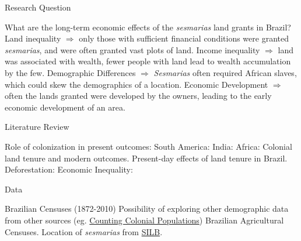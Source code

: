 \documentclass[aspectratio=1610, handout]{beamer}
\begin{document}
\begin{frame}{Research Question}
    \begin{outline}
        \1 What are the long-term economic effects of the \textit{sesmarias} land grants in Brazil?
            \2 Land inequality $\Rightarrow$ only those with sufficient financial conditions were granted \textit{sesmarias}, and were often granted vast plots of land.
            \2 Income inequality $\Rightarrow$ land was associated with wealth, fewer people with land lead to wealth accumulation by the few.
            \2 Demographic Differences $\Rightarrow$ \textit{Sesmarias} often required African slaves, which could skew the demographics of a location.
            \2 Economic Development $\Rightarrow$ often the lands granted were developed by the owners, leading to the early economic development of an area.
    \end{outline}
\end{frame}

\begin{frame}{Literature Review}
    \begin{outline}
        \1 Role of colonization in present outcomes:
            \2 South America: \parencites{Naritomi2012-or}{Musacchio2014-pq}{Wigton-Jones2020-ex}
            \2 India:
            \2 Africa: 
        \1 Colonial land tenure and modern outcomes.
            \2 \textcite{Banerjee2005-ki}
        \1 Present-day effects of land tenure in Brazil.
            \2 Deforestation: 
            \2 Economic Inequality: \parencites{Wigton-Jones2020-ex}
    \end{outline}
\end{frame}

\begin{frame}{Data}
    \begin{outline}
        \1 Brazilian Censuses (1872-2010)
            \2 Possibility of exploring other demographic data from other sources (eg. \href{http://colonialpopulations.fcsh.unl.pt/mainEnglish.php}{Counting Colonial Populations})
        \1 Brazilian Agricultural Censuses.
        \1 Location of \textit{sesmarias} from \href{http://plataformasilb.cchla.ufrn.br/}{SILB}.
    \end{outline}
\end{frame}
\end{document}
